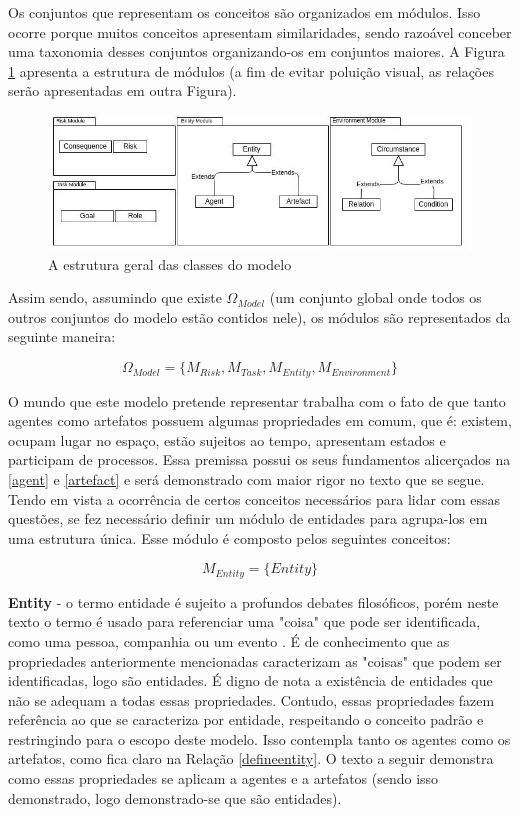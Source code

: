 Os conjuntos que representam os conceitos são organizados em  módulos. Isso ocorre porque muitos conceitos apresentam similaridades, sendo razoável conceber uma taxonomia desses conjuntos organizando-os em conjuntos maiores. A Figura \ref{module} apresenta a estrutura de módulos (a fim de evitar poluição visual, as relações serão apresentadas em outra Figura). 

\begin{figure}[H]
  \centering
  \includegraphics[width=1\linewidth]{figure/Module.jpeg} 
  \caption{A estrutura geral das classes do modelo}
  \label{module}
\end{figure}

Assim sendo, assumindo que existe $\Omega_{Model}$ (um conjunto global onde todos os outros conjuntos do modelo estão contidos nele), os módulos são representados da seguinte maneira: 

\begin{equation} 
    \Omega_{Model} = \{ M_{Risk}, M_{Task}, M_{Entity}, M_{Environment}\}
\end{equation}
\label{modules}


O mundo que este modelo pretende representar trabalha com o fato de que tanto agentes como artefatos possuem algumas propriedades em comum, que é: existem, ocupam lugar no espaço, estão sujeitos ao tempo, apresentam estados e participam de processos. Essa premissa possui os seus fundamentos alicerçados na \ref{agent} e \ref{artefact} e será demonstrado com maior rigor no texto que se segue. Tendo em vista a ocorrência de certos conceitos necessários para lidar com essas questões, se fez necessário definir um módulo de entidades para agrupa-los em uma estrutura única. Esse módulo é composto pelos seguintes conceitos:

\begin{equation} 
M_{Entity} = \{ Entity \}
\end{equation}\label{modent}

\textbf{Entity} - o termo entidade é sujeito a profundos debates filosóficos, porém neste texto o termo é usado para referenciar uma "coisa" que pode ser identificada, como uma pessoa, companhia ou um evento \cite{entity}. É de conhecimento que as propriedades anteriormente mencionadas caracterizam as "coisas" que podem ser identificadas, logo são entidades. É digno de nota a existência de entidades que não se adequam a todas essas propriedades. Contudo, essas propriedades fazem referência ao que se caracteriza por entidade, respeitando o conceito padrão \cite{entity} e restringindo para o escopo deste modelo. Isso contempla tanto os agentes como os artefatos, como fica claro na Relação \ref{defineentity}. O texto a seguir demonstra como essas propriedades se aplicam a agentes e a artefatos (sendo isso demonstrado, logo demonstrado-se que são entidades).

